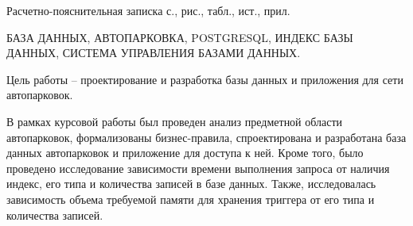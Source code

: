 
Расчетно-пояснительная записка \pageref{LastPage} с.,  рис.,  табл.,  ист.,  прил.

БАЗА ДАННЫХ, АВТОПАРКОВКА, POSTGRESQL, ИНДЕКС БАЗЫ ДАННЫХ, СИСТЕМА УПРАВЛЕНИЯ БАЗАМИ ДАННЫХ.

Цель работы -- проектирование и разработка базы данных и приложения для сети автопарковок.

В рамках курсовой работы был проведен анализ предметной области автопарковок, формализованы  бизнес-правила, спроектирована и разработана база данных автопарковок и приложение для доступа к ней.
Кроме того, было проведено исследование зависимости времени выполнения запроса от наличия индекс, его типа и количества записей в базе данных.
Также, исследовалась зависимость объема требуемой памяти для хранения триггера от его типа и количества записей.
